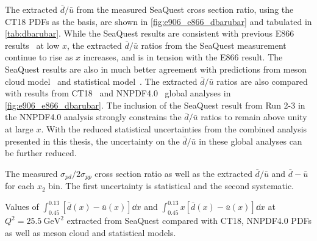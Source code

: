 \documentclass[reprint,aps,unsortedaddress,superscriptaddress,prc,floatfix,showpacs,linenumbers]{revtex4-2}
\begin{document}
The extracted $\bar{d}/\bar{u}$ from the measured SeaQuest cross section ratio,
using the CT18 PDFs as the basis, are shown in \cref{fig:e906_e866_dbarubar}
and tabulated in \cref{tab:dbarubar}.
While the SeaQuest results are consistent with previous E866 results~\cite{towell2001} at low $x$,
the extracted $\bar{d}/\bar{u}$ ratios from the SeaQuest measurement continue to rise as $x$ increases,
and is in tension with the E866 result.
The SeaQuest results are also in much better agreement with predictions from meson cloud model~\cite{alberg2022}
and statistical model~\cite{soffer2019}.
The extracted $\bar{d}/\bar{u}$ ratios are also compared with results from CT18~\cite{hou2021} and NNPDF4.0~\cite{ball2022a}
global analyses in \cref{fig:e906_e866_dbarubar}.
The inclusion of the SeaQuest result from Run 2-3 in the NNPDF4.0 analysis strongly constrains the $\bar{d}/\bar{u}$ ratios
to remain above unity at large $x$.
With the reduced statistical uncertainties from the combined analysis presented in this thesis,
the uncertainty on the $\bar{d}/\bar{u}$ in these global analyses can be further reduced.

\begin{table}[htbp!]
	\centering
	\caption{The measured $\sigma_{pd}/2\sigma_{pp}$ cross section ratio as well
		as the extracted $\bar{d}/\bar{u}$ and $\bar{d}-\bar{u}$ for each $x_{2}$ bin.
		The first uncertainty is statistical and the second systematic.}
	\label{tab:dbarubar}
	\begin{adjustbox}{max width=\textwidth}
		
	\end{adjustbox}
\end{table}
\begin{table}[htbp!]
	\centering
	\caption{Values of $\int_{0.45}^{0.13} \left[\bar{d}\left(x\right) - \bar{u}\left(x\right)\right] \dd{x}$
		and $\int_{0.45}^{0.13} x\left[\bar{d}\left(x\right) - \bar{u}\left(x\right)\right] \dd{x}$ at $Q^2=\SI{25.5}{\GeV\squared}$ extracted from
		SeaQuest compared with CT18, NNPDF4.0 PDFs as well as meson cloud and statistical models.}
	\label{tab:dbarMubar}
	\begin{adjustbox}{max width=\textwidth}
		
	\end{adjustbox}
\end{table}
\end{document}
